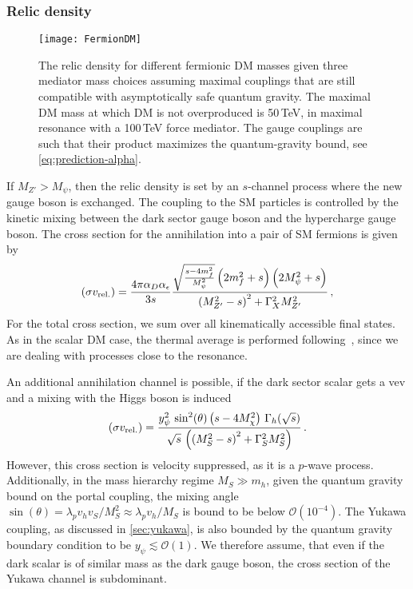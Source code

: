 \documentclass[aps,prd,twocolumn,preprintnumbers,superscriptaddress,nobibnotes,floatfix,longbibliography]{revtex4-1}
\begin{document}
\subsubsection*{Relic density}
\begin{figure}[t]
\texttt{[image: FermionDM]}
\caption{The relic density for different fermionic DM masses given three mediator mass choices assuming maximal couplings that are still compatible with asymptotically safe quantum gravity. The maximal DM mass at which DM is not overproduced is 50\,TeV, in maximal resonance with a 100\,TeV force mediator. The gauge couplings are such that their product maximizes the quantum-gravity bound, see \eqref{eq:prediction-alpha}. }
\label{fig:FermionDM}
\end{figure}
If $M_{Z'} > M_\psi$, then the relic density is set by an $s$-channel process where the new gauge boson is exchanged. The coupling to the SM particles is controlled by the kinetic mixing between the dark sector gauge boson and the hypercharge gauge boson. The cross section for the annihilation into a pair of SM fermions is given by 
\begin{align}
(\sigma v_{\rm rel.}) = \frac{4 \pi  \alpha_D \alpha_{\epsilon } }{3 s } \frac{\sqrt{\frac{s - 4 m_{f}^2}{M_{\psi}^2}} \left( 2 m_{f}^2+s \right) \left(2 M_{\psi}^2+s \right)}{ \left( M_{Z'}^2- s\right)^2 + \Gamma_{X}^2 M_{Z'}^2}\, ,
\end{align}
For the total cross section, we sum over all kinematically accessible final states. As in the scalar DM case, the thermal average is performed following~\cite{Gondolo:1990dk}, since we are dealing with processes close to the resonance. 

An additional annihilation channel is possible, if the dark sector scalar gets a vev and a mixing with the Higgs boson is induced 
\begin{align}
(\sigma v_{\rm rel.}) =  \frac{y_\psi^2\,\sin^2(\theta) \left(s - 4 M_{\chi}^2 \right) \,\Gamma_h(\sqrt{s})}{ \sqrt{s}\, \left( \left( M_{S}^2- s\right)^2 + \Gamma_{S}^2 M_{S}^2 \right) }\,.
\end{align}
However, this cross section is velocity suppressed, as it is a $p$-wave process. Additionally, in the mass hierarchy regime $M_S \gg m_h$, given the quantum gravity bound on the portal coupling, the mixing angle $\sin(\theta) = \lambda_p v_h v_S/M_S^2 \approx  \lambda_p v_h/M_S$ is bound to be below $\mathcal{O}(10^{-4})$. The Yukawa coupling, as discussed in \autoref{sec:yukawa}, is also bounded by the quantum gravity boundary condition to be $y_\psi \lesssim \mathcal{O}(1)$. We therefore assume, that even if the dark scalar is of similar mass as the dark gauge boson, the cross section of the Yukawa channel is subdominant.
\end{document}
